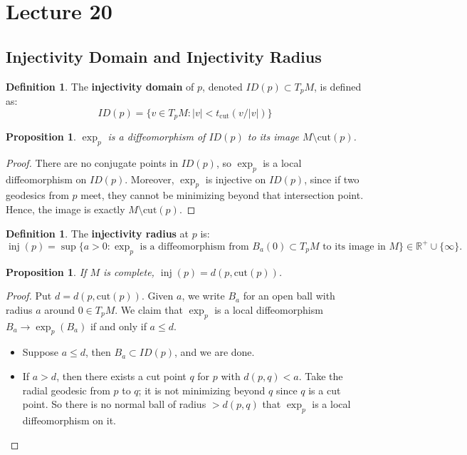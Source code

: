 \documentclass[11pt, a4paper]{article}
\theoremstyle{plain}
\newtheorem{proposition}[theorem]{Proposition}
\theoremstyle{definition}
\newtheorem{definition}[theorem]{Definition}
\theoremstyle{remark}
\begin{document}
{
    \section{Lecture 20}

    \subsection{Injectivity Domain and Injectivity Radius}

\begin{definition}
The \textbf{injectivity domain} of $p$, denoted $ID(p) \subset T_pM$, is defined as:
\[ ID(p) = \{ v \in T_pM : |v| < t_{\text{cut}}(v/|v|) \} \]
\end{definition}

\begin{proposition}
$\exp_p$ is a diffeomorphism of $ID(p)$ to its image $M \setminus \text{cut}(p)$.
\end{proposition}

\begin{proof}
There are no conjugate points in $ID(p)$, so $\exp_p$ is a local diffeomorphism on $ID(p)$. Moreover, $\exp_p$ is injective on $ID(p)$, since if two geodesics from $p$ meet, they cannot be minimizing beyond that intersection point. Hence, the image is exactly $M \setminus \text{cut}(p)$.
\end{proof}

\begin{definition}
The \textbf{injectivity radius} at $p$ is:
\[ \operatorname{inj}(p) = \sup \{ a > 0 : \exp_p \text{ is a diffeomorphism from } B_a(0) \subset T_pM \text{ to its image in } M \} \in \mathbb{R}^+ \cup \{\infty\}. \]
\end{definition}

\begin{proposition}
If $M$ is complete, $\operatorname{inj}(p) = d(p, \text{cut}(p))$.
\end{proposition}

\begin{proof}
Put $d = d(p, \text{cut}(p))$. Given $a$, we write $B_a$ for an open ball with radius $a$ around $0 \in T_pM$. We claim that $\exp_p$ is a local diffeomorphism $B_a \to \exp_p(B_a)$ if and only if $a \le d$.
\begin{itemize}
    \item Suppose $a \le d$, then $B_a \subset ID(p)$, and we are done.
    \item If $a > d$, then there exists a cut point $q$ for $p$ with $d(p,q) < a$. Take the radial geodesic from $p$ to $q$; it is not minimizing beyond $q$ since $q$ is a cut point. So there is no normal ball of radius $> d(p,q)$ that $\exp_p$ is a local diffeomorphism on it.
\end{itemize}
\end{proof}

}
\end{document}
